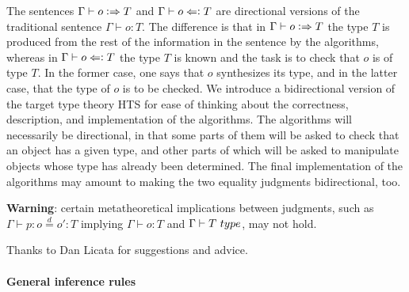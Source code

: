 \documentclass[11pt]{article}
\newcommand{\eqd}{\stackrel{d}{=}}
\newcommand{\synth}{\vcentcolon\Rightarrow}
\newcommand{\force}{\Leftarrow\vcentcolon}
\newcommand{\Type}{\mathop{{\, \sc type}}}
\begin{document}
The sentences $\Gamma\vdash o \synth T$ and $\Gamma\vdash o \force T$ are
directional versions of the traditional sentence $\Gamma\vdash o : T$.  The
difference is that in $\Gamma\vdash o \synth T$ the type $T$ is produced from
the rest of the information in the sentence by the algorithms, whereas in
$\Gamma\vdash o \force T$ the type $T$ is known and the task is to check that
$o$ is of type $T$.  In the former case, one says that $o$ synthesizes its
type, and in the latter case, that the type of $o$ is to be checked.  We
introduce a bidirectional version of the target type theory HTS for ease of
thinking about the correctness, description, and implementation of the
algorithms.  The algorithms will necessarily be directional, in that some parts
of them will be asked to check that an object has a given type, and other parts
of which will be asked to manipulate objects whose type has already been
determined.  The final implementation of the algorithms may amount to making
the two equality judgments bidirectional, too.

{\bf Warning}: certain metatheoretical implications between judgments, such as
$\Gamma \vdash p : o \eqd o' : T$ implying $\Gamma \vdash o : T$ and $\Gamma
\vdash T \Type$, may not hold.

Thanks to Dan Licata for suggestions and advice.

\paragraph{General inference rules} 
\end{document}
